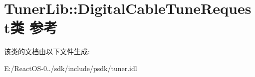 \hypertarget{class_tuner_lib_1_1_digital_cable_tune_request}{}\section{Tuner\+Lib\+:\+:Digital\+Cable\+Tune\+Request类 参考}
\label{class_tuner_lib_1_1_digital_cable_tune_request}


该类的文档由以下文件生成\+:\begin{DoxyCompactItemize}
\item 
E\+:/\+React\+O\+S-\/0../sdk/include/psdk/tuner.\+idl\end{DoxyCompactItemize}
